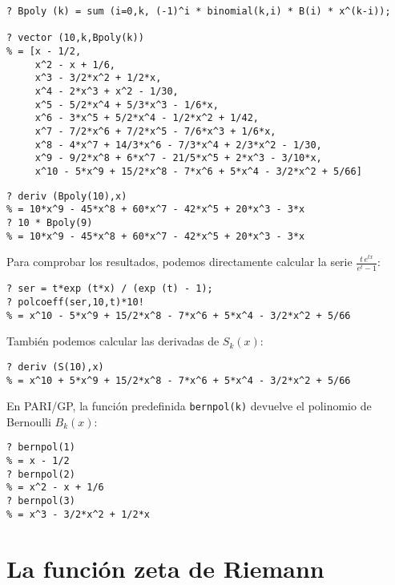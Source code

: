\documentclass{article}
\numberwithin{equation}{section}
\theoremstyle{definition}
\begin{document}
\begin{shaded}
\small

\begin{verbatim}
? Bpoly (k) = sum (i=0,k, (-1)^i * binomial(k,i) * B(i) * x^(k-i));

? vector (10,k,Bpoly(k))  
% = [x - 1/2,
     x^2 - x + 1/6,
     x^3 - 3/2*x^2 + 1/2*x,
     x^4 - 2*x^3 + x^2 - 1/30,
     x^5 - 5/2*x^4 + 5/3*x^3 - 1/6*x,
     x^6 - 3*x^5 + 5/2*x^4 - 1/2*x^2 + 1/42,
     x^7 - 7/2*x^6 + 7/2*x^5 - 7/6*x^3 + 1/6*x,
     x^8 - 4*x^7 + 14/3*x^6 - 7/3*x^4 + 2/3*x^2 - 1/30,
     x^9 - 9/2*x^8 + 6*x^7 - 21/5*x^5 + 2*x^3 - 3/10*x,
     x^10 - 5*x^9 + 15/2*x^8 - 7*x^6 + 5*x^4 - 3/2*x^2 + 5/66]
\end{verbatim}

\begin{verbatim}
? deriv (Bpoly(10),x)
% = 10*x^9 - 45*x^8 + 60*x^7 - 42*x^5 + 20*x^3 - 3*x
? 10 * Bpoly(9)
% = 10*x^9 - 45*x^8 + 60*x^7 - 42*x^5 + 20*x^3 - 3*x
\end{verbatim}

\noindent Para comprobar los resultados, podemos directamente calcular la serie
$\frac{t\,e^{tx}}{e^t - 1}$:

\begin{verbatim}
? ser = t*exp (t*x) / (exp (t) - 1);
? polcoeff(ser,10,t)*10!
% = x^10 - 5*x^9 + 15/2*x^8 - 7*x^6 + 5*x^4 - 3/2*x^2 + 5/66
\end{verbatim}

\noindent También podemos calcular las derivadas de $S_k (x)$:

\begin{verbatim}
? deriv (S(10),x)
% = x^10 + 5*x^9 + 15/2*x^8 - 7*x^6 + 5*x^4 - 3/2*x^2 + 5/66
\end{verbatim}

\noindent En PARI/GP, la función predefinida \verb|bernpol(k)| devuelve el
polinomio de Bernoulli $B_k (x)$:

\begin{verbatim}
? bernpol(1)
% = x - 1/2
? bernpol(2)
% = x^2 - x + 1/6
? bernpol(3)
% = x^3 - 3/2*x^2 + 1/2*x
\end{verbatim}
\end{shaded}


\pagebreak
\section{La función zeta de Riemann}
\end{document}
